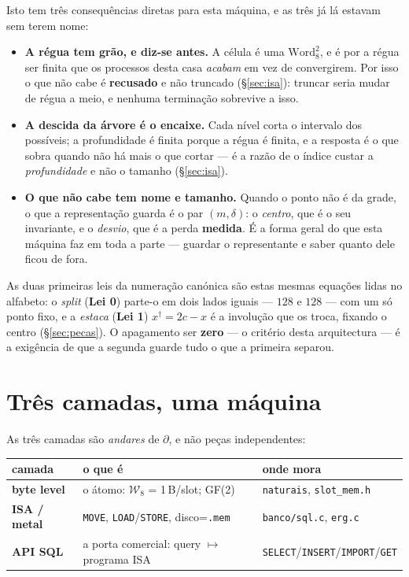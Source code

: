 \documentclass[11pt,a4paper]{article}
\newcommand{\code}[1]{\texttt{\small #1}}
\newcommand{\dg}{^{\dagger}}
\newcommand{\Word}{\mathcal{W}}
\begin{document}
\medskip\noindent Isto tem três consequências diretas para esta máquina, e as
três já lá estavam sem terem nome:

\begin{itemize}\itemsep3pt
\item[$\cdot$] \textbf{A régua tem grão, e diz-se antes.} A célula é uma
$\text{Word}_8^{2}$, e é por a régua ser finita que os processos desta casa
\emph{acabam} em vez de convergirem. Por isso o que não cabe é \textbf{recusado}
e não truncado (\S\ref{sec:isa}): truncar seria mudar de régua a meio, e nenhuma
terminação sobrevive a isso.
\item[$\cdot$] \textbf{A descida da árvore é o encaixe.} Cada nível corta o
intervalo dos possíveis; a profundidade é finita porque a régua é finita, e a
resposta é o que sobra quando não há mais o que cortar --- é a razão de o índice
custar a \emph{profundidade} e não o tamanho (\S\ref{sec:isa}).
\item[$\cdot$] \textbf{O que não cabe tem nome e tamanho.} Quando o ponto não é
da grade, o que a representação guarda é o par $(m,\delta)$: o \emph{centro},
que é o seu invariante, e o \emph{desvio}, que é a perda \textbf{medida}. É a
forma geral do que esta máquina faz em toda a parte --- guardar o representante
e saber quanto dele ficou de fora.
\end{itemize}

\medskip\noindent As duas primeiras leis da numeração canónica são estas mesmas
equações lidas no alfabeto: o \emph{split} (\textbf{Lei 0}) parte-o em dois
lados iguais --- $128$ e $128$ --- com um só ponto fixo, e a \emph{estaca}
(\textbf{Lei 1}) $x\dg=2c-x$ é a involução que os troca, fixando o centro
(\S\ref{sec:pecas}). O apagamento ser \textbf{zero} --- o critério desta
arquitectura --- é a exigência de que a segunda guarde tudo o que a primeira
separou.

\section*{Três camadas, uma máquina}

\noindent As três camadas são \emph{andares} de $\partial$, e não peças
independentes:

\begin{center}\small
\begin{tabular}{@{}llp{}@{}}
\toprule
camada & o que é & onde mora \\
\midrule
\textbf{byte level} & o átomo: $\Word_8$ = 1\,B/slot; GF(2) & \code{naturais}, \code{slot\_mem.h} \\
\textbf{ISA / metal} & \code{MOVE}, \code{LOAD}/\code{STORE}, disco=\code{.mem} & \code{banco/sql.c}, \code{erg.c} \\
\textbf{API SQL} & a porta comercial: query $\mapsto$ programa ISA & \code{SELECT}/\code{INSERT}/\code{IMPORT}/\code{GET} \\
\bottomrule
\end{tabular}
\end{center}
\end{document}
